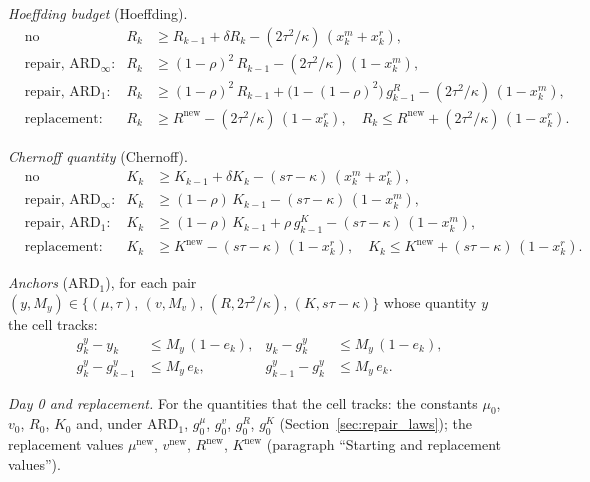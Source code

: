 \documentclass[11pt,a4paper]{article}
\theoremstyle{plain}
\theoremstyle{definition}
\newcommand{\ARDinf}{\mathrm{ARD}_{\infty}}
\newcommand{\ARDone}{\mathrm{ARD}_{1}}
\newcommand{\new}{\mathrm{new}}
\renewcommand{\_}{\textunderscore\allowbreak{}}
\begin{document}
\emph{Hoeffding budget} (Hoeffding).
\begin{align}
  &\text{no intervention:} & R_k &\geq R_{k-1} + \delta R_k
    - (2\tau^2/\kappa)\,(x^m_k + x^r_k),
    \label{eq:rf_R_carry} \\
  &\text{repair, } \ARDinf\text{:} & R_k &\geq (1-\rho)^2\, R_{k-1}
    - (2\tau^2/\kappa)\,(1 - x^m_k),
    \label{eq:rf_R_inf} \\
  &\text{repair, } \ARDone\text{:} & R_k &\geq (1-\rho)^2\, R_{k-1}
    + \bigl(1 - (1-\rho)^2\bigr)\, g^{R}_{k-1} - (2\tau^2/\kappa)\,(1 - x^m_k),
    \label{eq:rf_R_one} \\
  &\text{replacement:} & R_k &\geq R^{\new} - (2\tau^2/\kappa)\,(1 - x^r_k), \quad
    R_k \leq R^{\new} + (2\tau^2/\kappa)\,(1 - x^r_k).
    \label{eq:rf_R_repl}
\end{align}

\emph{Chernoff quantity} (Chernoff).
\begin{align}
  &\text{no intervention:} & K_k &\geq K_{k-1} + \delta K_k
    - (s\tau - \kappa)\,(x^m_k + x^r_k),
    \label{eq:rf_K_carry} \\
  &\text{repair, } \ARDinf\text{:} & K_k &\geq (1-\rho)\, K_{k-1}
    - (s\tau - \kappa)\,(1 - x^m_k),
    \label{eq:rf_K_inf} \\
  &\text{repair, } \ARDone\text{:} & K_k &\geq (1-\rho)\, K_{k-1} + \rho\, g^{K}_{k-1}
    - (s\tau - \kappa)\,(1 - x^m_k),
    \label{eq:rf_K_one} \\
  &\text{replacement:} & K_k &\geq K^{\new} - (s\tau - \kappa)\,(1 - x^r_k), \quad
    K_k \leq K^{\new} + (s\tau - \kappa)\,(1 - x^r_k).
    \label{eq:rf_K_repl}
\end{align}

\emph{Anchors} ($\ARDone$), for each pair
$(y, M_y) \in \{(\mu, \tau),\, (v, M_v),\, (R, 2\tau^2/\kappa),\, (K, s\tau - \kappa)\}$
whose quantity $y$ the cell tracks:
\begin{align}
  g^{y}_k - y_k &\leq M_y\,(1 - e_k), & y_k - g^{y}_k &\leq M_y\,(1 - e_k),
    \label{eq:rf_anchor_set} \\
  g^{y}_k - g^{y}_{k-1} &\leq M_y\, e_k, & g^{y}_{k-1} - g^{y}_k &\leq M_y\, e_k.
    \label{eq:rf_anchor_keep}
\end{align}

\emph{Day 0 and replacement.} For the quantities that the cell tracks: the constants
$\mu_0$, $v_0$, $R_0$, $K_0$ and, under $\ARDone$, $g^{\mu}_0$, $g^{v}_0$, $g^{R}_0$,
$g^{K}_0$ (Section~\ref{sec:repair_laws}); the replacement values $\mu^{\new}$,
$v^{\new}$, $R^{\new}$, $K^{\new}$ (paragraph ``Starting and replacement values'').
\end{document}
